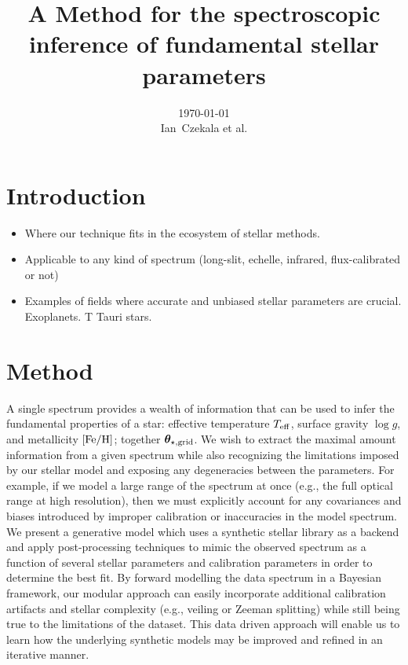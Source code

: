 \documentclass[preprint]{aastex} %
\newcommand{\vt}{ {\bm \theta}}
\newcommand{\vg}{\vt_{\star, {\rm grid}}}
\newcommand{\Z}{[{\rm Fe}/{\rm H}]}
\begin{document}
\graphicspath{{figs/}}

\title{A Method for the spectroscopic inference of fundamental stellar parameters}
\author{\today{}\\
\medskip
Ian~Czekala et al.
}


\section{Introduction}
\begin{itemize}
  \item Where our technique fits in the ecosystem of stellar methods.
  \item Applicable to any kind of spectrum (long-slit, echelle, infrared,
    flux-calibrated or not)
  \item Examples of fields where accurate and unbiased stellar parameters are
    crucial. Exoplanets. T Tauri stars.
\end{itemize}

\section{Method}

A single spectrum provides a wealth of information that can be used to infer the fundamental properties of a star: effective temperature $T_{\rm eff}$, surface gravity $\log g$, and metallicity $\Z$; together $\vg$. We wish to extract the maximal amount information from a given spectrum while also recognizing the limitations imposed by our stellar model and exposing any degeneracies between the parameters.  For example, if we model a large range of the spectrum at once (e.g., the full optical range at high resolution), then we must explicitly account for any covariances and biases introduced by improper calibration or inaccuracies in the model spectrum. We present a generative model which uses a synthetic stellar library as a backend and apply post-processing techniques to mimic the observed spectrum as a function of several stellar parameters and calibration parameters in order to determine the best fit. By forward modelling the data spectrum in a Bayesian framework, our modular approach can easily incorporate additional calibration artifacts and stellar complexity (e.g., veiling or Zeeman splitting) while still being true to the limitations of the dataset.  This data driven approach will enable us to learn how the underlying synthetic models may be improved and refined in an iterative manner.  
\end{document}
